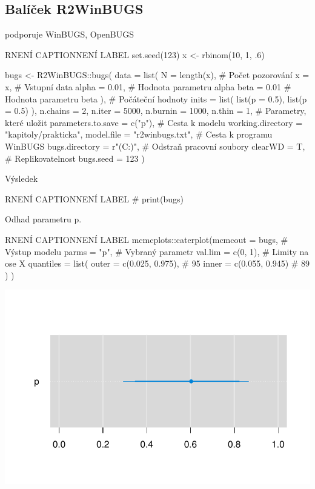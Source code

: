 \documentclass[
  11pt,
  a4paper]{report}
\begin{document}
\subsection{Balíček R2WinBUGS}\label{baluxedux10dek-r2winbugs}

podporuje WinBUGS, OpenBUGS

\begin{code}{R}{NENÍ CAPTION}{NENÍ LABEL}
set.seed(123)
x <- rbinom(10, 1, .6)

bugs <- R2WinBUGS::bugs(
    data = list(
        N     = length(x), # Počet pozorování
        x     = x,         # Vstupní data
        alpha = 0.01,      # Hodnota parametru alpha
        beta  = 0.01       # Hodnota parametru beta
    ),
    # Počáteční hodnoty
    inits = list(
        list(p = 0.5),
        list(p = 0.5)
    ),
    n.chains = 2, n.iter = 5000, n.burnin = 1000, n.thin = 1,
    # Parametry, které uložit
    parameters.to.save = c("p"),
    # Cesta k modelu
    working.directory = "kapitoly/prakticka",
    model.file = "r2winbugs.txt",
    # Cesta k programu WinBUGS
    bugs.directory = r"(C:\Users\Mike\Downloads{})",
    # Odstraň pracovní soubory
    clearWD = T,
    # Replikovatelnost
    bugs.seed = 123
)
\end{code}

Výsledek

\begin{code}{R}{NENÍ CAPTION}{NENÍ LABEL}
# print(bugs)
\end{code}

Odhad parametru p.

\begin{code}{R}{NENÍ CAPTION}{NENÍ LABEL}
mcmcplots::caterplot(mcmcout = bugs,             # Výstup modelu
                     parms = "p",                # Vybraný parametr
                     val.lim = c(0, 1),          # Limity na ose X
                     quantiles = list(
                        outer = c(0.025, 0.975), # 95%
                        inner = c(0.055, 0.945)  # 89%
                     )
)
\end{code}

\includegraphics{index_files/figure-pdf/unnamed-chunk-6-1.pdf}
\end{document}
